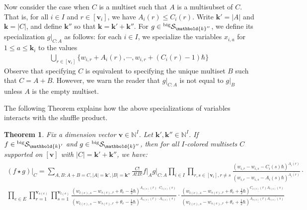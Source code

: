 \documentclass[11pt,reqno]{amsart}
\renewcommand{\mathbf}{\mathbold}
\numberwithin{equation}{section}
\newtheorem{Theorem}[equation]{Theorem}
\theoremstyle{definition}
\newcommand{\cS}{\mathcal{S}}
\newcommand{\bk}{\mathbf{k}}
\newcommand{\bv}{\mathbf{v}}
\newcommand{\NN}{\mathbb{N}}
\newcommand{\leftexp}[2]{\vphantom{#2}^{#1} #2}
\renewcommand{\bv}{\mathbf{v}} %
\newcommand{\preshu}{\leftexp{\mathrm{big}}{\cS}}
\begin{document}
Now consider the case when $C$ is a multiset such that $A$ is a multisubset of $C$. That is, for all $i \in I$ and $r \in [\bv_i]$, we have $A_i(r) \leq C_i(r)$. Write $\bk' = |A|$ and $\bk = |C|$, and define $\bk''$ so that $\bk = \bk' + \bk''$. 
For $g \in \preshu_{\bk''}$, we define its specialization $g \vert_{C:A}$ as follows: for each $i \in I$, we specialize the variables $x_{i,a}$ for $1 \leq a \leq \bk_i$ to the values
\begin{align}
  \label{eq:13}
  \bigcup_{r \in [\bv_i]} \{ w_{i,r} + A_i(r) , \cdots , w_{i,r} + (C_i(r) - 1) \hbar \}
\end{align}
Observe that specifying $C$ is equivalent to specifying the unique multiset $B$ such that $C = A + B$. However, we warn the reader that $g\vert_{C:A}$ is not equal to $g\vert_B$ unless $A$ is the empty multiset.


The following Theorem explains how the above specializations of variables interacts with the shuffle product.

\begin{Theorem}
  \label{thm:specializing-variables-and-shuffle-product}
  Fix a dimension vector $\bv \in \NN^I$. Let $\bk',\bk'' \in \NN^I$. If $f \in \preshu_{\bk'}$ and $g \in \preshu_{\bk''}$, then for all $I$-colored multisets $C$ supported on $[\bv]$ with $|C| = \bk' + \bk''$, we have:
  \begin{align*}
    (f \star g )\vert_{C} = \sum_{A,B: A+B = C, |A| = \bk', |B| = \bk''} \frac{C!}{A! B!}  f\vert_A g\vert_{C:A}
    \prod_{i \in I} \prod_{r,s \in [\bv_i], r \neq s} \frac{(w_{i,r} - w_{i,s} - C_i(s) \hbar)^{\overline{A_i(r)}}}{(w_{i,r} - w_{i,s} - A_i(s)\hbar)^{\overline{A_i(r)}}} \cdot \\
    \prod_{e \in E} \prod_{r = 1}^{\bv_{s(e)}} \prod_{s = 1}^{\bv_{t(e)}}  \frac{(w_{t(e),s} - w_{s(e),r} + \theta_e - \tfrac{1}{2} \hbar)^{\underline{A_{s(e)}(r)} \cdot \overline{C_{t(e)}(s)}}}{ (w_{t(e),s} - w_{s(e),r} + \theta_e  -\tfrac{1}{2}\hbar )^{\underline{A_{s(e)}(r)} \cdot \overline{A_{t(e)}(s)}}} \cdot 
 \frac{ (w_{t(e),s} - w_{s(e),r} + \theta_e + \tfrac{1}{2}\hbar)^{\underline{C_{s(e)}(r)} \overline{A_{t(e)}(s)} }} { (w_{t(e),s} - w_{s(e),r} + \theta_e + \tfrac{1}{2}\hbar)^{\underline{A_{s(e)}(r)} \overline{A_{t(e)}(s)} } }
  \end{align*}
\end{Theorem}
\end{document}
